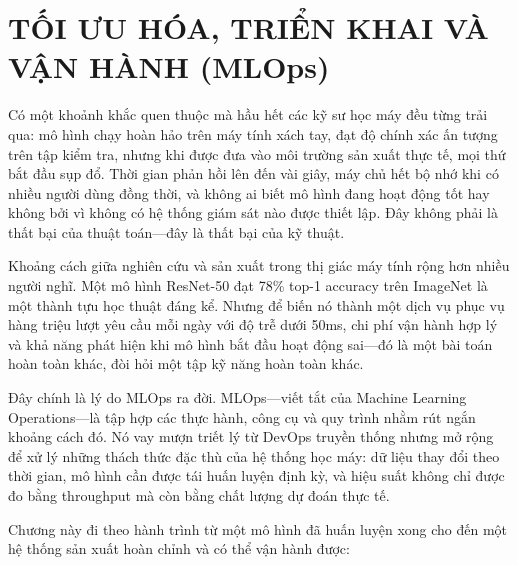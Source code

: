 \chapter{TỐI ƯU HÓA, TRIỂN KHAI VÀ VẬN HÀNH (MLOps)}
\label{chap:p2_mlops}

Có một khoảnh khắc quen thuộc mà hầu hết các kỹ sư học máy đều từng trải qua: mô hình chạy hoàn hảo trên máy tính xách tay, đạt độ chính xác ấn tượng trên tập kiểm tra, nhưng khi được đưa vào môi trường sản xuất thực tế, mọi thứ bắt đầu sụp đổ. Thời gian phản hồi lên đến vài giây, máy chủ hết bộ nhớ khi có nhiều người dùng đồng thời, và không ai biết mô hình đang hoạt động tốt hay không bởi vì không có hệ thống giám sát nào được thiết lập. Đây không phải là thất bại của thuật toán---đây là thất bại của kỹ thuật.

Khoảng cách giữa nghiên cứu và sản xuất trong thị giác máy tính rộng hơn nhiều người nghĩ. Một mô hình ResNet-50 đạt 78\% top-1 accuracy trên ImageNet là một thành tựu học thuật đáng kể. Nhưng để biến nó thành một dịch vụ phục vụ hàng triệu lượt yêu cầu mỗi ngày với độ trễ dưới 50ms, chi phí vận hành hợp lý và khả năng phát hiện khi mô hình bắt đầu hoạt động sai---đó là một bài toán hoàn toàn khác, đòi hỏi một tập kỹ năng hoàn toàn khác.

Đây chính là lý do MLOps ra đời. MLOps---viết tắt của Machine Learning Operations---là tập hợp các thực hành, công cụ và quy trình nhằm rút ngắn khoảng cách đó. Nó vay mượn triết lý từ DevOps truyền thống nhưng mở rộng để xử lý những thách thức đặc thù của hệ thống học máy: dữ liệu thay đổi theo thời gian, mô hình cần được tái huấn luyện định kỳ, và hiệu suất không chỉ được đo bằng throughput mà còn bằng chất lượng dự đoán thực tế.

Chương này đi theo hành trình từ một mô hình đã huấn luyện xong cho đến một hệ thống sản xuất hoàn chỉnh và có thể vận hành được:

